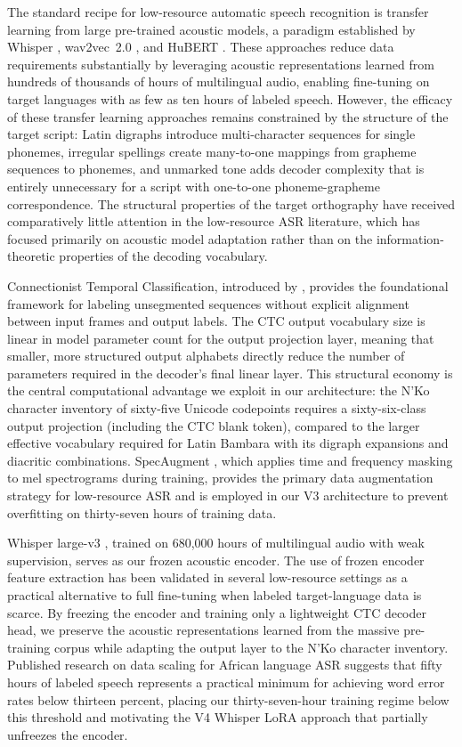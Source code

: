 \documentclass[11pt]{article}
\newcommand{\nko}{N'Ko}
\begin{document}
The standard recipe for low-resource automatic speech recognition is transfer learning from large pre-trained acoustic models, a paradigm established by Whisper \cite{radford2023robust}, wav2vec~2.0 \cite{baevski2020wav2vec}, and HuBERT \cite{hsu2021hubert}. These approaches reduce data requirements substantially by leveraging acoustic representations learned from hundreds of thousands of hours of multilingual audio, enabling fine-tuning on target languages with as few as ten hours of labeled speech. However, the efficacy of these transfer learning approaches remains constrained by the structure of the target script: Latin digraphs introduce multi-character sequences for single phonemes, irregular spellings create many-to-one mappings from grapheme sequences to phonemes, and unmarked tone adds decoder complexity that is entirely unnecessary for a script with one-to-one phoneme-grapheme correspondence. The structural properties of the target orthography have received comparatively little attention in the low-resource ASR literature, which has focused primarily on acoustic model adaptation rather than on the information-theoretic properties of the decoding vocabulary.

Connectionist Temporal Classification, introduced by \citet{graves2006connectionist}, provides the foundational framework for labeling unsegmented sequences without explicit alignment between input frames and output labels. The CTC output vocabulary size is linear in model parameter count for the output projection layer, meaning that smaller, more structured output alphabets directly reduce the number of parameters required in the decoder's final linear layer. This structural economy is the central computational advantage we exploit in our architecture: the \nko{} character inventory of sixty-five Unicode codepoints requires a sixty-six-class output projection (including the CTC blank token), compared to the larger effective vocabulary required for Latin Bambara with its digraph expansions and diacritic combinations. SpecAugment \cite{park2019specaugment}, which applies time and frequency masking to mel spectrograms during training, provides the primary data augmentation strategy for low-resource ASR and is employed in our V3 architecture to prevent overfitting on thirty-seven hours of training data.

Whisper large-v3 \cite{radford2023robust}, trained on 680,000 hours of multilingual audio with weak supervision, serves as our frozen acoustic encoder. The use of frozen encoder feature extraction has been validated in several low-resource settings as a practical alternative to full fine-tuning when labeled target-language data is scarce. By freezing the encoder and training only a lightweight CTC decoder head, we preserve the acoustic representations learned from the massive pre-training corpus while adapting the output layer to the \nko{} character inventory. Published research on data scaling for African language ASR \cite{data_scaling_2024} suggests that fifty hours of labeled speech represents a practical minimum for achieving word error rates below thirteen percent, placing our thirty-seven-hour training regime below this threshold and motivating the V4 Whisper LoRA approach that partially unfreezes the encoder.
\end{document}
